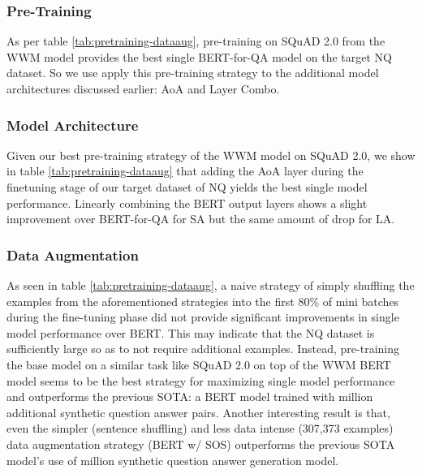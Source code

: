 \documentclass[letterpaper]{article} \usepackage{aaai20}  \usepackage{times}  \usepackage{helvet} \usepackage{courier}  \usepackage[hyphens]{url}  \usepackage{graphicx} \urlstyle{rm} \def\UrlFont{\rm}  \usepackage{graphicx}  \frenchspacing  \setlength{\pdfpagewidth}{8.5in}  \setlength{\pdfpageheight}{11in}  \usepackage{amsmath}
\begin{document}
\subsubsection{Pre-Training} 
As per table \ref{tab:pretraining-dataaug}, pre-training on SQuAD 2.0 from the WWM  model provides the best single BERT-for-QA model on the target NQ dataset. So we use apply this pre-training strategy to the additional model architectures discussed earlier: AoA and Layer Combo.

\subsubsection{Model Architecture}
Given our best pre-training strategy of the WWM model on SQuAD 2.0, we show in table \ref{tab:pretraining-dataaug} that adding the AoA layer during the finetuning stage of our target dataset of NQ yields the best single model performance. Linearly combining the BERT output layers shows a slight improvement over BERT-for-QA for SA but the same amount of drop for LA. 

\subsubsection{Data Augmentation}
As seen in table \ref{tab:pretraining-dataaug}, a naive strategy of simply shuffling the examples from the aforementioned strategies into the first 80\% of mini batches during the fine-tuning phase did not provide significant improvements in single model performance over BERT. This may indicate that the NQ dataset is sufficiently large so as to not require additional examples.  Instead, pre-training the base model on a similar task like SQuAD 2.0 on top of the WWM BERT model seems to be the best strategy for maximizing single model performance and outperforms the previous SOTA: a BERT model trained with  million additional synthetic question answer pairs. Another interesting result is that, even the simpler (sentence shuffling) and less data intense (307,373 examples) data augmentation strategy (BERT w/ SOS) outperforms the previous SOTA model's use of  million synthetic question answer generation model.
\end{document}
